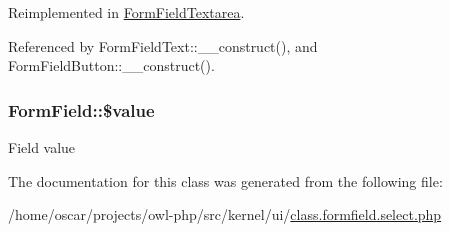 Reimplemented in \hyperlink{classFormFieldTextarea_a85348034822c70694fc8640bfcacc04d}{FormFieldTextarea}.



Referenced by FormFieldText::\_\-\_\-construct(), and FormFieldButton::\_\-\_\-construct().

\subsubsection[{\$value}]{\setlength{\rightskip}{0pt plus 5cm}FormField::\$value}\label{classFormField_a3c01e89834248eec8e2f145fbcfa0fbc}
Field value 

The documentation for this class was generated from the following file:\begin{DoxyCompactItemize}
\item 
/home/oscar/projects/owl-\/php/src/kernel/ui/\hyperlink{class_8formfield_8select_8php}{class.formfield.select.php}\end{DoxyCompactItemize}
